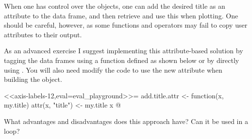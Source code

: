 \begin{explainbox}
When one has control over the objects, one can add the desired title as an attribute to the data frame, and then retrieve and use this when plotting. One should be careful, however, as some functions and operators may fail to copy user attributes to their output.

\begin{playground}

As an advanced exercise I suggest implementing this attribute-based solution by tagging the data frames using a function defined as shown below or by directly using . You will also need modify the code to use the new attribute when building the  object.

<<axis-labels-12,eval=eval_playground>>=
add.title.attr <- function(x, my.title) {
  attr(x, "title") <- my.title
  x
}
@

What advantages and disadvantages does this approach have? Can it be used in a loop?

\end{playground}

\end{explainbox}